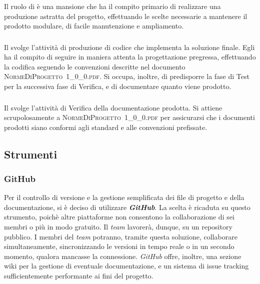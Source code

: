 		\subsubsection{\Prog}
		Il ruolo di \textit{\Prog} è una mansione che ha il compito primario di realizzare una produzione astratta del progetto, effettuando le scelte necessarie a mantenere il prodotto modulare, di facile manutenzione e ampliamento.
		
		\subsubsection{\Progr}
		Il \textit{\Progr} svolge l'attività di produzione di codice che implementa la soluzione finale. Egli ha il compito di seguire in maniera attenta la progettazione pregressa, effettuando la codifica seguendo le convenzioni descritte nel documento \hbox{\textsc{NormeDiProgetto 1\_0\_0.pdf}}. Si occupa, inoltre, di predisporre la fase di Test per la successiva fase di Verifica, e di documentare quanto viene prodotto.
		
		\subsubsection{\Ver}
		Il \textit{\Ver} svolge l'attività di Verifica della documentazione prodotta. Si attiene scrupolosamente a \hbox{\textsc{NormeDiProgetto 1\_0\_0.pdf}} per assicurarsi che i documenti prodotti siano conformi agli standard e alle convenzioni prefissate.

	\subsection{Strumenti}

		\subsubsection{GitHub}
		Per il controllo di versione e la gestione semplificata dei file di progetto e della documentazione, si è deciso di utilizzare \textbf{\textit{GitHub}}. La scelta è ricaduta su questo strumento, poichè altre piattaforme non consentono la collaborazione di sei membri o più in modo gratuito. Il \textit{team} lavorerà, dunque, su un repository pubblico. I membri del \textit{team} potranno, tramite questa soluzione, collaborare simultaneamente, sincronizzando le versioni in tempo reale o in un secondo momento, qualora mancasse la connessione. \textit{GitHub} offre, inoltre, una sezione wiki per la gestione di eventuale documentazione, e un sistema di issue tracking sufficientemente performante ai fini del progetto.

